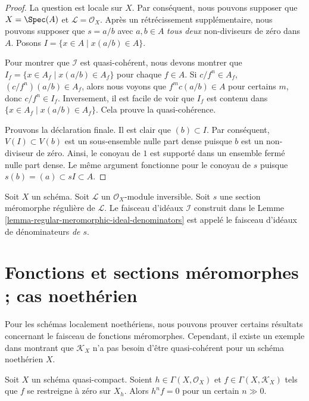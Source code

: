 \begin{proof}
La question est locale sur  $X$. Par conséquent, nous pouvons supposer que
 $X = \Spec(A)$ et  $\mathcal{L} = \mathcal{O}_X$. Après un rétrécissement supplémentaire, nous pouvons
supposer que  $s = a/b$  avec  $a, b \in A$   {\it  tous deux
}  non-diviseurs de zéro dans  $A$. Posons  $I = \{x \in A \mid x(a/b) \in A\}$.

\medskip\noindent
Pour montrer que  $\mathcal{I}$  est quasi-cohérent, nous devons montrer que
 $I_f = \{x \in A_f \mid x(a/b) \in A_f\}$  pour chaque  $f \in A$. Si  $c/f^n \in A_f$,  $(c/f^n)(a/b) \in A_f$, alors nous
voyons que  $f^mc(a/b) \in A$  pour certains  $m$, donc  $c/f^n \in I_f$.
Inversement, il est facile de voir que  $I_f$  est contenu dans  $\{x \in A_f \mid x(a/b) \in A_f\}$.
Cela prouve la quasi-cohérence.

\medskip\noindent
Prouvons la déclaration finale. Il est clair que  $(b) \subset I$. Par conséquent,
 $V(I) \subset V(b)$  est un sous-ensemble nulle part dense puisque  $b$  est un
non-diviseur de zéro. Ainsi, le conoyau de  $1$  est supporté dans un
ensemble fermé nulle part dense. Le même argument fonctionne pour le conoyau de
 $s$  puisque  $s(b) = (a) \subset sI \subset A$.
\end{proof}

\begin{definition}
\label{definition-regular-meromorphic-ideal-denominators}
Soit  $X$  un schéma. Soit  $\mathcal{L}$  un  $\mathcal{O}_X$-module inversible.
Soit  $s$  une section méromorphe régulière de  $\mathcal{L}$. Le faisceau
d'idéaux  $\mathcal{I}$  construit dans le Lemme  \ref{lemma-regular-meromorphic-ideal-denominators}  est appelé le faisceau
d'idéaux de dénominateurs  {\it  de  $s$}.
\end{definition}




\section{Fonctions et sections méromorphes ; cas noethérien}
\label{section-meromorphic-noetherian}

\noindent
Pour les schémas localement noethériens, nous pouvons prouver certains résultats
concernant le faisceau de fonctions méromorphes. Cependant, il existe un exemple
dans  \cite{misconceptions}  montrant que  $\mathcal{K}_X$  n'a pas besoin d'être quasi-cohérent
pour un schéma noethérien  $X$.

\begin{lemma}
\label{lemma-meromorphic-section-restricts-to-zero}
Soit  $X$  un schéma quasi-compact. Soient  $h \in \Gamma(X, \mathcal{O}_X)$  et  $f \in \Gamma(X, \mathcal{K}_X)$ 
tels que  $f$  se restreigne à zéro sur  $X_h$. Alors  $h^n f = 0$ 
pour un certain  $n \gg 0$.
\end{lemma}

